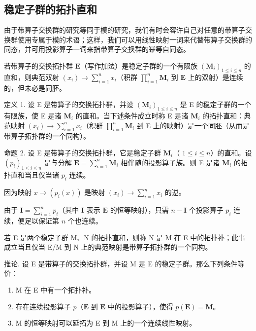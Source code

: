 \subsection{稳定子群的拓扑直和}

由于带算子交换群的研究等同于模的研究，我们有时会容许自己对任意的带算子交换群使用专属于模的术语；这样，我们可以用线性映射一词来代替带算子交换群的同态，并可用投影算子一词来指带算子交换群的幂等自同态。

若带算子的交换拓扑群 \(\mathbf{E}\)（写作加法）是稳定子群的一个有限族 \((\mathbf{M}_i)_{1 \leqslant i \leqslant n}\) 的直和，则典范双射 \((x_i) \to \sum_{i=1}^{n} x_i\)（积群 \(\prod_{i=1}^{n} \mathbf{M}_i\) 到 \(\mathbf{E}\) 上的双射）是连续的，但未必是同胚。

定义 1. 设 E 是带算子的交换拓扑群，并设 \((\mathbf{M}_i)_{1 \leqslant i \leqslant n}\) 是 E 的稳定子群的一个有限族，使 E 是诸 \(\mathbf{M}_i\) 的直和。当下述条件成立时称 E 是诸 \(\mathbf{M}_i\) 的拓扑直和：典范映射 \((x_i) \to \sum_{i=1}^{n} x_i\)（积群 \(\prod_{i=1}^{n} \mathbf{M}_i\) 到 E 上的映射）是一个同胚（从而是带算子拓扑群的一个同构）。

命题 2. 设 E 是带算子的交换拓扑群，它是稳定子群 \(\mathbf{M}_i\)（ \(1 \leqslant i \leqslant n\)）的直和。设 \((p_i)_{1 \leqslant i \leqslant n}\) 是与分解 \(\mathbf{E} = \sum_{i=1}^{n} \mathbf{M}_i\) 相伴随的投影算子族。则 E 是诸 \(\mathbf{M}_i\) 的拓扑直和当且仅当诸 \(p_i\) 连续。

因为映射 \(x \to (p_i(x))\) 是映射 \((x_i) \to \sum_{i=1}^{n} x_i\) 的逆。

由于 \(\mathbf{I} = \sum_{i=1}^{n} p_i\)（其中 \(\mathbf{I}\) 表示 \(\mathbf{E}\) 的恒等映射），只需 \(n - \mathbf{I}\) 个投影算子 \(p_i\) 连续，便足以保证第 \(n\) 个也连续。

若 E 是两个稳定子群 M、N 的拓扑直和，则称 N 是 M 在 E 中的拓扑补；此事成立当且仅当 E/M 到 N 上的典范映射是带算子拓扑群的一个同构。

推论. 设 E 是带算子的交换拓扑群，并设 M 是 E 的稳定子群。那么下列条件等价：

\begin{enumerate}
\def\labelenumi{\alph{enumi})}
\item
  M 在 E 中有一个拓扑补。
\item
  存在连续投影算子 \(p\)（\(\mathbf{E}\) 到 \(\mathbf{E}\) 中的投影算子），使得 \(p(\mathbf{E}) = \mathbf{M}\)。
\item
  M 的恒等映射可以延拓为 E 到 M 上的一个连续线性映射。
\end{enumerate}

